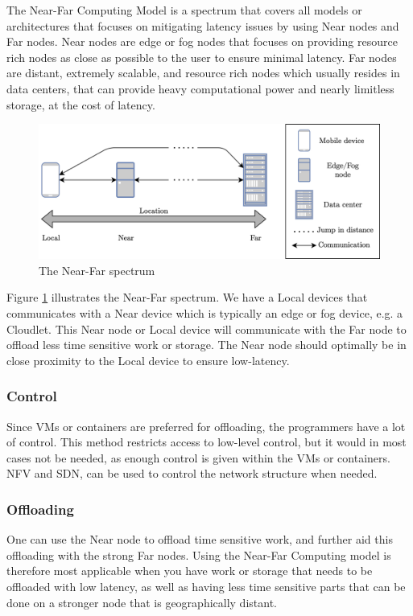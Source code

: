 The Near-Far Computing Model is a spectrum that covers all models or architectures that focuses on mitigating latency issues by using Near nodes and Far nodes. Near nodes are edge or fog nodes that focuses on providing resource rich nodes as close as possible to the user to ensure minimal latency. Far nodes are distant, extremely scalable, and resource rich nodes which usually resides in data centers, that can provide heavy computational power and nearly limitless storage, at the cost of latency.

\begin{figure}[t]
    \centering
    \includegraphics[scale=1]{chapters/6_evaluation/figures/near-far_diagram.png}
    \caption{The Near-Far spectrum}
    \label{fig:nearFarSimple}
\end{figure}


Figure \ref{fig:nearFarSimple} illustrates the Near-Far spectrum. We have a Local devices that communicates with a Near device which is typically an edge or fog device, e.g. a Cloudlet. This Near node or Local device will communicate with the Far node to offload less time sensitive work or storage. The Near node should optimally be in close proximity to the Local device to ensure low-latency.

\subsubsection{Control}
Since VMs or containers are preferred for offloading, the programmers have a lot of control. This method restricts access to low-level control, but it would in most cases not be needed, as enough control is given within the VMs or containers. NFV and SDN, can be used to control the network structure when needed. 

\subsubsection{Offloading}
One can use the Near node to offload time sensitive work, and further aid this offloading with the strong Far nodes. Using the Near-Far Computing model is therefore most applicable when you have work or storage that needs to be offloaded with low latency, as well as having less time sensitive parts that can be done on a stronger node that is geographically distant. 


